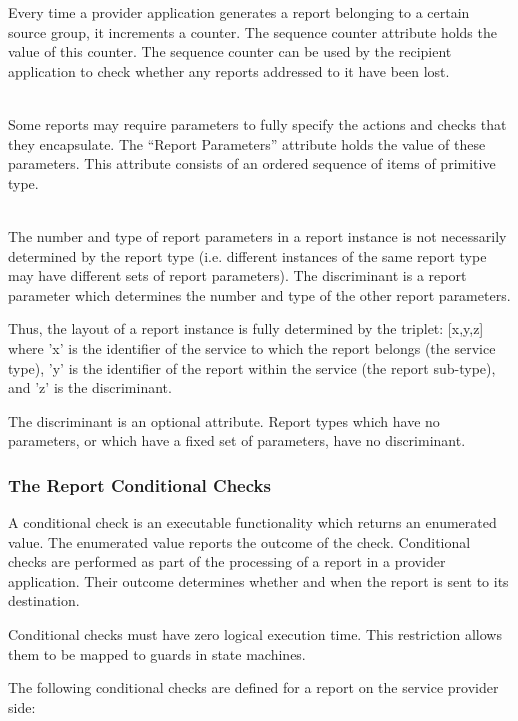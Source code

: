 \begin{fw_description}
Every time a provider application generates a report belonging to a certain source group, it increments a counter. The sequence counter attribute holds the value of this counter. The sequence counter can be used by the recipient application to check whether any reports addressed to it have been lost. 
\item[Report Parameters]\hfill\\
Some reports may require parameters to fully specify the actions and checks that they encapsulate. The “Report Parameters” attribute holds the value of these parameters. This attribute consists of an ordered sequence of items of primitive type. 
\item[Discriminant]\hfill\\
The number and type of report parameters in a report instance is not necessarily determined by the report type (i.e. different instances of the same report type may have different sets of report parameters). The discriminant is a report parameter which determines the number and type of the other report parameters. 

Thus, the layout of a report instance is fully determined by the triplet: [x,y,z] where 'x' is the identifier of the service to which the report belongs (the service type), 'y' is the identifier of the report within the service (the report sub-type), and 'z' is the discriminant. 

The discriminant is an optional attribute. Report types which have no parameters, or which have a fixed set of parameters, have no discriminant.
\end{fw_description}

\subsubsection{The Report Conditional Checks}\label{sec:RepConditionalChecks}

A conditional check is an executable functionality which returns an enumerated value. The enumerated value reports the outcome of the check. Conditional checks are performed as part of the processing of a report in a provider application. Their outcome determines whether and when the report is sent to its destination. 

Conditional checks must have zero logical execution time. This restriction allows them to be mapped to guards in state machines. 

The following conditional checks are defined for a report on the service provider side:

